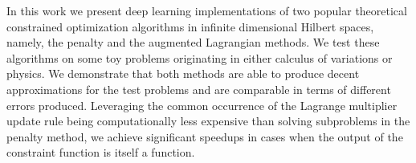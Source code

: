 
In this work we present deep learning implementations of two popular theoretical constrained optimization algorithms in infinite dimensional Hilbert spaces, namely, the penalty and the augmented Lagrangian methods. We test these algorithms on some toy problems originating in either calculus of variations or physics. We demonstrate that both methods are able to produce decent approximations for the test problems and are comparable in terms of different errors produced. Leveraging the common occurrence of the Lagrange multiplier update rule being computationally less expensive than solving subproblems in the penalty method, we achieve significant speedups in cases when the output of the constraint function is itself a function.
